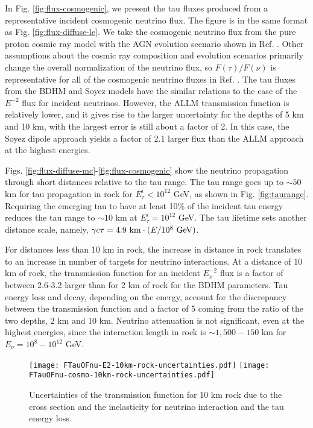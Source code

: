 \documentclass[aps,10pt,twocolumn,tightenlines]{revtex4-1}
\begin{document}
In Fig. \ref{fig:flux-cosmogenic}, we present the tau fluxes produced from a representative incident cosmogenic neutrino flux. The figure is in the 
same format as Fig. \ref{fig:flux-diffuse-le}. We take the cosmogenic neutrino flux from the pure proton cosmic ray model 
with the AGN evolution scenario shown in  Ref. \cite{Aloisio:2015ega}. 
Other assumptions about the cosmic ray composition and evolution scenarios primarily change the overall normalization of the neutrino flux, so
$F(\tau)/F(\nu)$ is representative for all of the cosmogenic neutrino fluxes in Ref. \cite{Aloisio:2015ega}. 
The tau fluxes from the BDHM and Soyez models have the similar relations to the case of the $E^{-2}$ flux for incident neutrinos.
However, the ALLM transmission function is relatively lower, and it gives rise to the larger uncertainty for the depths of 5 km and 10 km,
with the largest error is still about a factor of 2. In this case, 
the Soyez dipole approach yields a factor of 2.1 larger flux 
than the ALLM approach at the highest energies.

Figs. \ref{fig:flux-diffuse-mc}-\ref{fig:flux-cosmogenic} show the neutrino propagation through short distances relative to the tau range. The tau range goes up to $\sim 50$ km for tau propagation in rock for $E_\tau^i<10^{12}$ GeV, as shown in Fig. \ref{fig:taurange}.
Requiring the emerging tau to have at least 10\% of the incident tau energy reduces the tau range to $\sim 10$ km at $E_\tau^i=10^{12}$ GeV.
The tau lifetime sets another distance scale, namely, $\gamma c\tau = 4.9\ {\rm km}\cdot (E/{10^8\ {\rm GeV}})$. 

For distances less than 10 km in rock, the increase in distance in rock translates to an increase in number of targets for neutrino interactions. At a distance of 10 km of rock, the transmission function for an incident $E_\nu^{-2}$ flux is a factor of between 2.6-3.2 larger than for 2 km of rock for the BDHM parameters. Tau energy loss and decay, depending on the energy, account for the discrepancy between the 
transmission function and a factor of 5 coming from the ratio of the two depths, 2 km and 10 km.
Neutrino attenuation is not significant, even at the highest energies, since the interaction length in rock 
is $\sim 1,500-150$ km for $E_\nu=10^8-10^{12}$ GeV. 

\begin{figure}[htb]
\centering
	\texttt{[image: FTauOFnu-E2-10km-rock-uncertainties.pdf]}
	\texttt{[image: FTauOFnu-cosmo-10km-rock-uncertainties.pdf]}
	\caption{ Uncertainties of the transmission function 
 for 10 km rock
	due to the cross section and the inelasticity for neutrino interaction and the tau energy loss.
	}
\label{fig:errors-10km}
\end{figure}
\end{document}

